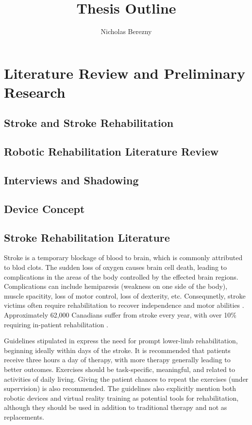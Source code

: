 \documentclass[12pt]{report}
\author{Nicholas Berezny}
\title{Thesis Outline}
\begin{document}
\maketitle
\newpage

\chapter{Literature Review and Preliminary Research}

\section{Stroke and Stroke Rehabilitation}
\section{Robotic Rehabilitation Literature Review}
\section{Interviews and Shadowing}
\section{Device Concept} 


\section{Stroke Rehabilitation Literature}
%

Stroke is a temporary blockage of blood to brain, which is commonly attributed to blod clots. The sudden loss of oxygen causes brain cell death, leading to complications in the areas of the body controlled by the effected brain regions. Complications can include hemiparesis (weakness on one side of the body), muscle spacitity, loss of motor control, loss of dexterity, etc. Consequnetly, stroke victims often require rehabilitation to recover independence and motor abilities \cite{Stroke}. Approximately 62,000 Canadians suffer from stroke every year, with over 10\% requiring in-patient rehabilitation \cite{Hebert2016}. 

Guidelines stipulated in \cite{Hebert2016} express the need for prompt lower-limb rehabilitation, beginning ideally within days of the stroke. It is recommended that patients receive three hours a day of therapy, with more therapy generally leading to better outcomes. Exercises should be task-specific, meaningful, and related to activities of daily living. Giving the patient chances to repeat the exercises (under supervision) is also recommended.  The guidelines also explicitly mention both robotic devices and virtual reality training as potential tools for rehabilitation, although they should be used in addition to traditional therapy and not as replacements.  
\end{document}
